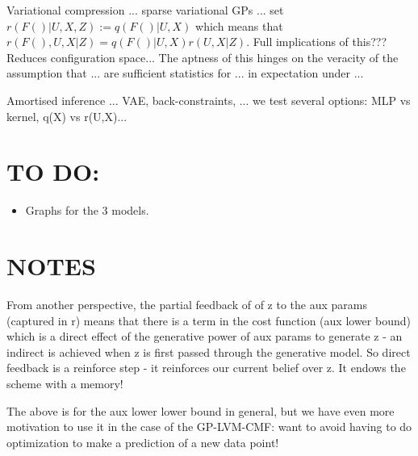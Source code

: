 \documentclass{article}
\begin{document}
Variational compression ... sparse variational GPs ... set $r(F()|U,X,Z):=q(F()|U,X)$ which means that $r(F(),U,X|Z) = q(F()|U,X)r(U,X|Z)$. Full implications of this??? Reduces configuration space... The aptness of this hinges on the veracity of the assumption that ... are sufficient statistics for ... in expectation under ...

Amortised inference ... VAE, back-constraints, ... we test several options: MLP vs kernel, q(X) vs r(U,X)...


\section{TO DO:}
\begin{itemize}
  \item Graphs for the 3 models.
\end{itemize}

\section{NOTES}

From another perspective, the partial feedback of of z to the aux params (captured in r) means that there is a term in the cost function (aux lower bound) which is a direct effect of the generative power of aux params to generate z - an indirect is achieved when z is first passed through the generative model. So direct feedback is a reinforce step - it reinforces our current belief over z. It endows the scheme with a memory!

The above is for the aux lower lower bound in general, but we have even more motivation to use it in the case of the GP-LVM-CMF: want to avoid having to do optimization to make a prediction of a new data point!
\end{document}
